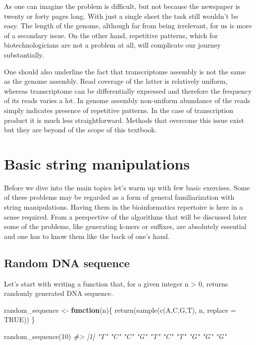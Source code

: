 \documentclass[
]{book}
\newenvironment{Shaded}{\begin{snugshade}}{\end{snugshade}}
\newcommand{\AttributeTok}[1]{\textcolor[rgb]{0.77,0.63,0.00}{#1}}
\newcommand{\CommentTok}[1]{\textcolor[rgb]{0.56,0.35,0.01}{\textit{#1}}}
\newcommand{\ConstantTok}[1]{\textcolor[rgb]{0.00,0.00,0.00}{#1}}
\newcommand{\ControlFlowTok}[1]{\textcolor[rgb]{0.13,0.29,0.53}{\textbf{#1}}}
\newcommand{\DecValTok}[1]{\textcolor[rgb]{0.00,0.00,0.81}{#1}}
\newcommand{\FunctionTok}[1]{\textcolor[rgb]{0.00,0.00,0.00}{#1}}
\newcommand{\NormalTok}[1]{#1}
\newcommand{\OtherTok}[1]{\textcolor[rgb]{0.56,0.35,0.01}{#1}}
\newcommand{\StringTok}[1]{\textcolor[rgb]{0.31,0.60,0.02}{#1}}
\begin{document}
As one can imagine the problem is difficult, but not because the newspaper is twenty or forty pages long. With just a single sheet the task still wouldn't be easy. The length of the genome, although far from being irrelevant, for us is more of a secondary issue. On the other hand, repetitive patterns, which for biotechnologicians are not a problem at all, will complicate our journey substantially.

One should also underline the fact that transcriptome assembly is not the same as the genome assembly. Read coverage of the latter is relatively uniform, whereas transcriptome can be differentially expressed and therefore the frequency of its reads varies a lot. In genome assembly non-uniform abundance of the reads simply indicates presence of repetitive patterns. In the case of transcription product it is much less straightforward. Methods that overcome this issue exist but they are beyond of the scope of this textbook.

\hypertarget{basic}{%
\chapter{Basic string manipulations}\label{basic}}

Before we dive into the main topics let's warm up with few basic exercises. Some of these problems may be regarded as a form of general familiarization with string manipulations. Having them in the bioinformatics repertoire is here in a sense required. From a perspective of the algorithms that will be discussed later some of the problems, like generating k-mers or suffixes, are absolutely essential and one has to know them like the back of one's hand.

\hypertarget{random-dna-sequence}{%
\section{Random DNA sequence}\label{random-dna-sequence}}

Let's start with writing a function that, for a given integer n \textgreater{} 0, returns randomly generated DNA sequence.

\begin{Shaded}
\begin{Highlighting}[]
\NormalTok{random\_sequence }\OtherTok{\textless{}{-}} \ControlFlowTok{function}\NormalTok{(n)\{}
  \FunctionTok{return}\NormalTok{(}\FunctionTok{sample}\NormalTok{(}\FunctionTok{c}\NormalTok{(}\StringTok{\textquotesingle{}A\textquotesingle{}}\NormalTok{,}\StringTok{\textquotesingle{}C\textquotesingle{}}\NormalTok{,}\StringTok{\textquotesingle{}G\textquotesingle{}}\NormalTok{,}\StringTok{\textquotesingle{}T\textquotesingle{}}\NormalTok{), n, }\AttributeTok{replace =} \ConstantTok{TRUE}\NormalTok{))}
\NormalTok{\}}

\FunctionTok{random\_sequence}\NormalTok{(}\DecValTok{10}\NormalTok{)}
\CommentTok{\#\textgreater{}  [1] "T" "C" "C" "G" "T" "C" "T" "G" "G" "G"}
\end{Highlighting}
\end{Shaded}
\end{document}
